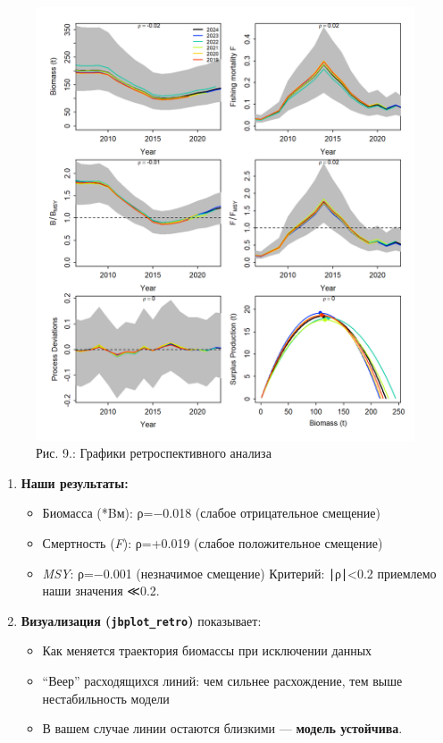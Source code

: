 \documentclass[
  letterpaper,
  DIV=11,
  numbers=noendperiod]{scrreprt}
\begin{document}
\begin{figure}[H]

{\centering \includegraphics[width=0.8\linewidth,height=\textheight,keepaspectratio]{images/JABBA9.png}

}

\caption{Рис. 9.: Графики ретроспективного анализа}

\end{figure}%

\begin{enumerate}
\def\labelenumi{\arabic{enumi}.}
\item
  \textbf{Наши результаты:}

  \begin{itemize}
  \item
    Биомасса (*Bм): ρ=−0.018 (слабое отрицательное смещение)
  \item
    Смертность (\emph{F}): ρ=+0.019 (слабое положительное смещение)
  \item
    \emph{MSY}: ρ=−0.001 (незначимое смещение) Критерий: ∣ρ∣\textless0.2
    приемлемо наши значения ≪0.2.
  \end{itemize}
\item
  \textbf{Визуализация (\texttt{jbplot\_retro})} показывает:

  \begin{itemize}
  \item
    Как меняется траектория биомассы при исключении данных
  \item
    ``Веер'' расходящихся линий: чем сильнее расхождение, тем выше
    нестабильность модели
  \item
    В вашем случае линии остаются близкими --- \textbf{модель
    устойчива}.
  \end{itemize}
\end{enumerate}
\end{document}

